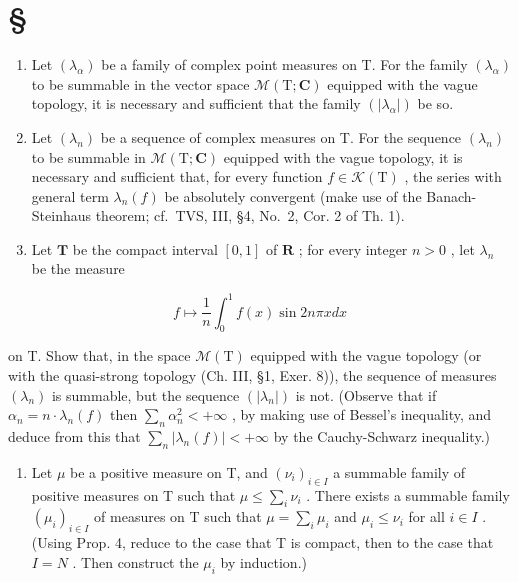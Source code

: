 \section*{\texorpdfstring{\S\CurrentExerciseGroup}{Section \CurrentExerciseGroup}}
{}

\begin{enumerate}
\def\labelenumi{\arabic{enumi})}
\item
  Let \((\lambda_{\alpha})\) be a family of complex point measures on T. For the family \((\lambda_{\alpha})\) to be summable in the vector space \(\mathcal{M}(\mathrm{T};\mathbf{C})\) equipped with the vague topology, it is necessary and sufficient that the family \((|\lambda_{\alpha}|)\) be so.
\item
  Let \((\lambda_{n})\) be a sequence of complex measures on T. For the sequence \((\lambda_{n})\) to be summable in \(\mathcal{M}(\mathrm{T};\mathbf{C})\) equipped with the vague topology, it is necessary and sufficient that, for every function \(f\in \mathcal{K}(\mathrm{T})\) , the series with general term \(\lambda_{n}(f)\) be absolutely convergent (make use of the Banach-Steinhaus theorem; cf.~TVS, III, §4, No.~2, Cor. 2 of Th. 1).
\item
  Let \(\mathbf{T}\) be the compact interval \([0,1]\) of \(\mathbf{R}\) ; for every integer \(n > 0\) , let \(\lambda_{n}\) be the measure
\end{enumerate}

\[
f \mapsto \frac {1}{n} \int_ {0} ^ {1} f (x) \sin 2 n \pi x d x
\]

on T. Show that, in the space \(\mathcal{M}(\mathrm{T})\) equipped with the vague topology (or with the quasi-strong topology (Ch. III, §1, Exer. 8)), the sequence of measures \((\lambda_n)\) is summable, but the sequence \((|\lambda_n|)\) is not. (Observe that if \(\alpha_n = n \cdot \lambda_n(f)\) then \(\sum_{n} \alpha_n^2 < +\infty\) , by making use of Bessel's inequality, and deduce from this that \(\sum_{n} |\lambda_n(f)| < +\infty\) by the Cauchy-Schwarz inequality.)

\begin{enumerate}
\def\labelenumi{\arabic{enumi})}
\setcounter{enumi}{3}
\tightlist
\item
  Let \(\mu\) be a positive measure on T, and \((\nu_{i})_{i\in I}\) a summable family of positive measures on T such that \(\mu \leqslant \sum_{i}\nu_{i}\) . There exists a summable family \((\mu_{i})_{i\in I}\) of measures on T such that \(\mu = \sum_{i}\mu_{i}\) and \(\mu_{i} \leqslant \nu_{i}\) for all \(i \in I\) . (Using Prop. 4, reduce to the case that T is compact, then to the case that \(I = N\) . Then construct the \(\mu_{i}\) by induction.)
\end{enumerate}

\setcounter{exercisegroup}{3}
\edef\CurrentExerciseGroup{\arabic{exercisegroup}}
